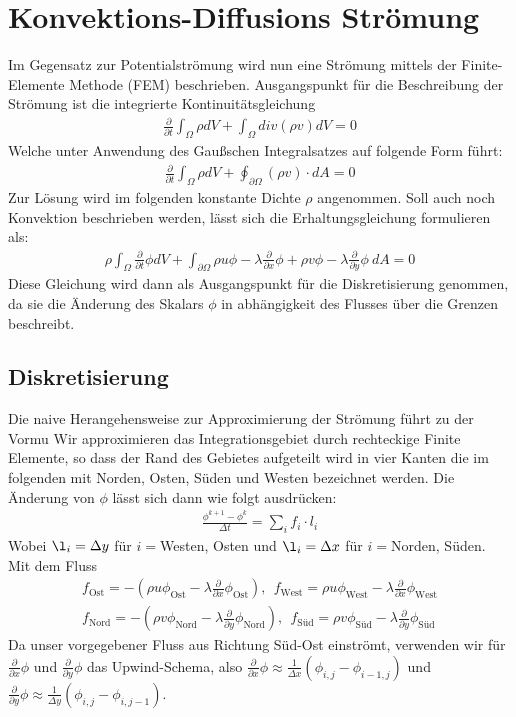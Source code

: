\documentclass{article}
\newcommand{\ddt}{\frac{\partial }{\partial t}}
\newcommand{\ddx}{\frac{\partial }{\partial x}}
\newcommand{\ddy}{\frac{\partial }{\partial y}}
\begin{document}
\section{Konvektions-Diffusions Strömung}
Im Gegensatz zur Potentialströmung wird nun eine Strömung mittels der Finite-Elemente Methode (FEM) beschrieben. Ausgangspunkt
für die Beschreibung der Strömung ist die integrierte Kontinuitätsgleichung
\begin{align}
\ddt \int_{\Omega} \rho dV + \int_{\Omega} div(\rho v) dV = 0
\end{align}
Welche unter Anwendung des Gaußschen Integralsatzes auf folgende Form führt:
\begin{align}
\ddt \int_{\Omega} \rho dV + \oint_{\partial \Omega} (\rho v)\cdot dA = 0
\end{align}	
Zur Lösung wird im folgenden konstante Dichte $\rho$ angenommen. 
Soll auch noch Konvektion beschrieben werden, lässt sich die Erhaltungsgleichung formulieren als:
\begin{align}
\rho \int_{\Omega}\ddt \phi dV + \int_{\partial \Omega}\rho u \phi -\lambda \ddx \phi + \rho v \phi - \lambda \ddy \phi \ dA =0 
\end{align}
Diese Gleichung wird dann als Ausgangspunkt für die Diskretisierung genommen, 
da sie die Änderung des Skalars $\phi$ in abhängigkeit des Flusses über die Grenzen beschreibt.

\subsection{Diskretisierung}
Die naive Herangehensweise zur Approximierung der Strömung führt zu der Vormu
Wir approximieren das Integrationsgebiet durch rechteckige Finite Elemente, so dass der Rand des Gebietes aufgeteilt wird in vier Kanten
die im folgenden mit Norden, Osten, Süden und Westen bezeichnet werden. 
Die Änderung von $\phi$ lässt sich dann wie folgt ausdrücken:
\begin{align}
\frac{\phi^{k+1}-\phi^k}{\Delta t} = \sum_{i} f_i\cdot l_i
\end{align}
Wobei $\l_i = \Delta y$ für $i=$Westen, Osten und $\l_i = \Delta x$ für $i=$Norden, Süden.
Mit dem Fluss
\begin{align}
f_{\text{Ost}} = -(\rho u \phi_{\text{Ost}}- \lambda \ddx \phi_{\text{Ost}}), \ \ 
f_{\text{West}} = \rho u \phi_{\text{West}}- \lambda \ddx \phi_{\text{West}} \\
f_{\text{Nord}} = -(\rho v \phi_{\text{Nord}}- \lambda \ddy \phi_{\text{Nord}}),\ \ 
f_{\text{Süd}} = \rho v \phi_{\text{Süd}}- \lambda \ddy \phi_{\text{Süd}}
\end{align} 
Da unser vorgegebener Fluss aus Richtung Süd-Ost einströmt, verwenden wir für $\ddx \phi$ und $\ddy \phi$ das Upwind-Schema,
also $\ddx \phi \approx \frac{1}{\Delta x}(\phi_{i,j}-\phi_{i-1,j})$ und  $\ddy \phi \approx \frac{1}{\Delta y}(\phi_{i,j}-\phi_{i,j-1})$.
\end{document}
